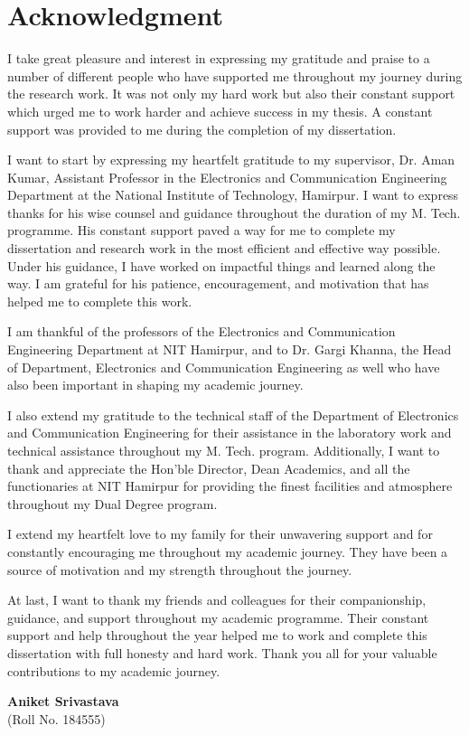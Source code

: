 \chapter*{Acknowledgment}
I take great pleasure and interest in expressing my gratitude and praise to a number of different people who have supported me throughout my journey during the research work. It was not only my hard work but also their constant support which urged me to work harder and achieve success in my thesis. A constant support was provided to me during the completion of my dissertation.

\par
I want to start by expressing my heartfelt gratitude to my supervisor, Dr. Aman Kumar, Assistant Professor in the Electronics and Communication Engineering Department at the National Institute of Technology, Hamirpur. I want to express thanks for his wise counsel and guidance throughout the duration of my M. Tech. programme. His constant support paved a way for me to complete my dissertation and research work in the most efficient and effective way possible. Under his guidance, I have worked on impactful things and learned along the way. I am grateful for his patience, encouragement, and motivation that has helped me to complete this work.

\par
I am thankful of the professors of the Electronics and Communication Engineering Department at NIT Hamirpur, and to Dr. Gargi Khanna, the Head of Department, Electronics and Communication Engineering as well who have also been important in shaping my academic journey.

\par
I also extend my gratitude to the technical staff of the Department of Electronics and Communication Engineering for their assistance in the laboratory work and technical assistance throughout my M. Tech. program.
Additionally, I want to thank and appreciate the Hon’ble Director, Dean Academics, and all the functionaries at NIT Hamirpur for providing the finest facilities and atmosphere throughout my Dual Degree program.

\par
I extend my heartfelt love to my family for their unwavering support and for constantly encouraging me throughout my academic journey. They have been a source of motivation and my strength throughout the journey.

\par
At last, I want to thank my friends and colleagues for their companionship, guidance, and support throughout my academic programme. 
Their constant support and help throughout the year helped me to work and complete this dissertation with full honesty and hard work. Thank you all for your valuable contributions to my academic journey.

\begin{flushright}
\begin{minipage}{0.4\textwidth}
\begin{center}
{\bf Aniket Srivastava}\\
(Roll No. 184555)
\end{center}
\end{minipage}
\end{flushright}


